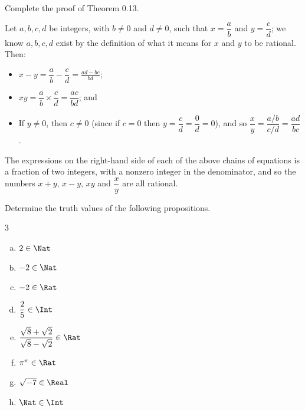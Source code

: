 \begin{exercise}
\label{exRationalNumbersAreAField}
Complete the proof of Theorem 0.13.
\end{exercise}

\begin{solutions*}
Let $a,b,c,d$ be integers, with $b \ne 0$ and $d \ne 0$, such that $x=\dfrac{a}{b}$ and $y=\dfrac{c}{d}$; we know $a,b,c,d$ exist by the definition of what it means for $x$ and $y$ to be rational. Then:
\begin{itemize}
\item $x-y = \dfrac{a}{b} - \dfrac{c}{d} = \frac{ad-bc}{bd}$;
\item $xy = \dfrac{a}{b} \times \dfrac{c}{d} = \dfrac{ac}{bd}$; and
\item If $y \ne 0$, then $c \ne 0$ (since if $c=0$ then $y=\dfrac{c}{d}=\dfrac{0}{d}=0$), and so $\dfrac{x}{y} = \dfrac{a/b}{c/d} = \dfrac{ad}{bc}$.
\end{itemize}
The expressions on the right-hand side of each of the above chains of equations is a fraction of two integers, with a nonzero integer in the denominator, and so the numbers $x+y$, $x-y$, $xy$ and $\dfrac{x}{y}$ are all rational.%
\end{solutions*}

\begin{exercise}
\label{exElementsOfNumberSets}
Determine the truth values of the following propositions.
\begin{multicols}{3}
\begin{enumerate}[(a)]
\item $2 \in \Nat$
\item $-2 \in \Nat$
\item $-2 \in \Rat$
\item $\dfrac{2}{5} \in \Int$
\item $\dfrac{\sqrt{8}+\sqrt{2}}{\sqrt{8}-\sqrt{2}} \in \Rat$
\item $\pi^{\pi} \in \Rat$
\item $\sqrt{-7} \in \Real$
\item\label{itmNElementOfZ} $\Nat \in \Int$
\end{enumerate}
\end{multicols}
\end{exercise}

